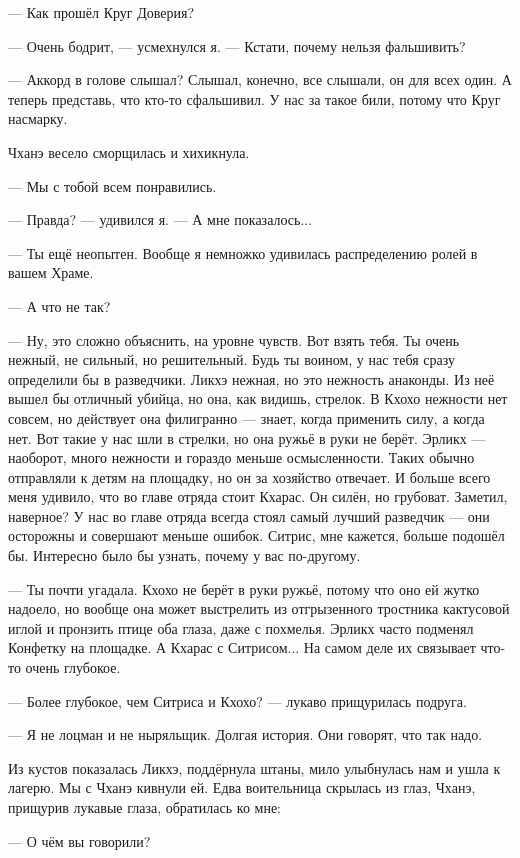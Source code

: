--- Как прошёл Круг Доверия?

--- Очень бодрит, --- усмехнулся я.
--- Кстати, почему нельзя фальшивить?

--- Аккорд в голове слышал?
Слышал, конечно, все слышали, он для всех один.
А теперь представь, что кто-то сфальшивил.
У нас за такое били, потому что Круг насмарку.

Чханэ весело сморщилась и хихикнула.

--- Мы с тобой всем понравились.

--- Правда? --- удивился я.
--- А мне показалось...

--- Ты ещё неопытен.
Вообще я немножко удивилась распределению ролей в вашем Храме.

--- А что не так?

--- Ну, это сложно объяснить, на уровне чувств.
Вот взять тебя.
Ты очень нежный, не сильный, но решительный.
Будь ты воином, у нас тебя сразу определили бы в разведчики.
Ликхэ нежная, но это нежность анаконды.
Из неё вышел бы отличный убийца, но она, как видишь, стрелок.
В Кхохо нежности нет совсем, но действует она филигранно --- знает, когда применить силу, а когда нет.
Вот такие у нас шли в стрелки, но она ружьё в руки не берёт.
Эрликх --- наоборот, много нежности и гораздо меньше осмысленности.
Таких обычно отправляли к детям на площадку, но он за хозяйство отвечает.
И больше всего меня удивило, что во главе отряда стоит Кхарас.
Он силён, но грубоват.
Заметил, наверное?
У нас во главе отряда всегда стоял самый лучший разведчик --- они осторожны и совершают меньше ошибок.
Ситрис, мне кажется, больше подошёл бы.
Интересно было бы узнать, почему у вас по-другому.

--- Ты почти угадала.
Кхохо не берёт в руки ружьё, потому что оно ей жутко надоело, но вообще она может выстрелить из отгрызенного тростника кактусовой иглой и пронзить птице оба глаза, даже с похмелья.
Эрликх часто подменял Конфетку на площадке.
А Кхарас с Ситрисом...
На самом деле их связывает что-то очень глубокое.

--- Более глубокое, чем Ситриса и Кхохо? --- лукаво прищурилась подруга.

--- Я не лоцман и не ныряльщик.
Долгая история.
Они говорят, что так надо.

Из кустов показалась Ликхэ, поддёрнула штаны, мило улыбнулась нам и ушла к лагерю.
Мы с Чханэ кивнули ей.
Едва воительница скрылась из глаз, Чханэ, прищурив лукавые глаза, обратилась ко мне:

--- О чём вы говорили?


